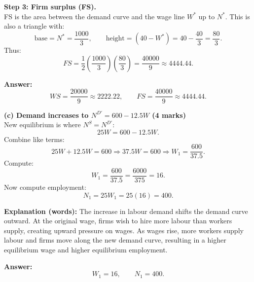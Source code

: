 \documentclass[12pt]{article}
\begin{document}
\textbf{Step 3: Firm surplus (FS).}\\
FS is the area between the demand curve and the wage line $W^*$ up to $N^*$.
This is also a triangle with:
\[
\text{base}=N^*=\frac{1000}{3},
\qquad
\text{height}=\left(40-W^*\right)=40-\frac{40}{3}=\frac{80}{3}.
\]
Thus:
\[
FS=\frac{1}{2}\left(\frac{1000}{3}\right)\left(\frac{80}{3}\right)
= \frac{40000}{9}
\approx 4444.44.
\]

\vspace{0.6em}

\textbf{Answer:}
\[
WS=\frac{20000}{9}\approx 2222.22,
\qquad
FS=\frac{40000}{9}\approx 4444.44.
\]

\vspace{0.8em}

\textbf{(c) Demand increases to $N^{D'}=600-12.5W$ (4 marks)}\\
New equilibrium is where $N^S=N^{D'}$:
\[
25W = 600 - 12.5W.
\]
Combine like terms:
\[
25W + 12.5W = 600
\Rightarrow 37.5W=600
\Rightarrow W_1 = \frac{600}{37.5}.
\]
Compute:
\[
W_1 = \frac{600}{37.5} = \frac{6000}{375} = 16.
\]
Now compute employment:
\[
N_1 = 25W_1 = 25(16)=400.
\]

\textbf{Explanation (words):} The increase in labour demand shifts the demand curve outward. At the original wage, firms wish to hire more labour than workers supply, creating upward pressure on wages. As wages rise, more workers supply labour and firms move along the new demand curve, resulting in a higher equilibrium wage and higher equilibrium employment.

\vspace{0.6em}

\textbf{Answer:}
\[
W_1 = 16,
\qquad
N_1 = 400.
\]
\end{document}
